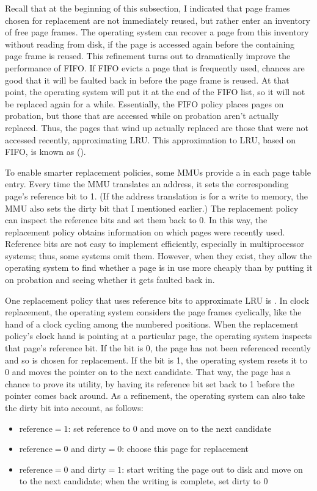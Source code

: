 Recall that at the beginning of this subsection, I indicated that
page frames chosen for replacement are not immediately reused, but
rather enter an inventory of free page frames.  The operating system
can recover a page from this inventory without reading from disk, if
the page is accessed again before the containing page frame is reused.  This
refinement turns out to dramatically improve the performance of FIFO.
If FIFO evicts a page that is frequently used, chances are good that
it will be faulted back in before the page frame is reused.  At that
point, the operating system will put it at the end of the FIFO list,
so it will not be replaced again for a while.  Essentially, the FIFO
policy places pages on probation, but those that are accessed while on
probation aren't actually replaced.  Thus, the pages that wind up
actually replaced are those that were not accessed recently,
approximating LRU.  This approximation to LRU, based on FIFO, is known
as  ().

To enable smarter replacement policies, some MMUs provide a
 in each page table entry.  Every time the MMU
translates an address, it sets the corresponding page's reference bit
to 1.  (If the address translation is for a write to memory, the MMU
also sets the dirty bit that I mentioned earlier.)  The replacement policy
can inspect the reference bits and set them back to 0.  In this way,
the replacement policy obtains information on which pages were
recently used.  Reference bits are not easy to implement efficiently,
especially in multiprocessor systems; thus, some systems omit them.
However, when they exist, they allow the operating system to find
whether a page is in use more cheaply than by putting it on probation
and seeing whether it gets faulted back in.

One replacement policy that uses reference bits to approximate LRU is
.  In clock replacement, the operating system
considers the page frames cyclically, like the hand of a clock cycling
among the numbered positions.  When the replacement policy's clock
hand is pointing at a particular page, the operating system inspects
that page's reference bit.  If the bit is 0, the page has not been
referenced recently and so is chosen for replacement.  If the bit is
1, the operating system resets it to 0 and moves the pointer on to the
next candidate.  That way, the page has a chance to prove its utility,
by having its reference bit set back to 1 before the pointer comes
back around.  As a refinement, the operating system can also take the
dirty bit into account, as follows:
\begin{itemize}
\item
$\mbox{reference}=1$: set reference to 0 and move on to the next
  candidate
\item
$\mbox{reference}=0$ and $\mbox{dirty} = 0$: choose this page for replacement
\item
$\mbox{reference}=0$ and $\mbox{dirty} = 1$: start writing the page
  out to disk and move on to the next candidate; when the
  writing is complete, set dirty to 0
\end{itemize}

